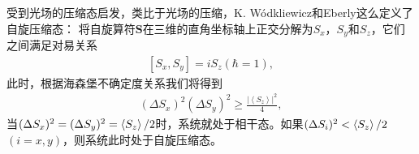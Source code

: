 受到光场的压缩态启发，类比于光场的压缩，K. W\'odkliewicz和Eberly\cite{wodkiewicz1987k}这么定义了自旋压缩态：
将自旋算符$\mathbf{S}$在三维的直角坐标轴上正交分解为$S_x$，$S_y$和$S_z$，它们之间满足对易关系
\begin{align}
	\left[ {{S_x},{S_y}} \right] = i{S_z}\left( {\hbar  = 1} \right),\label{eq338}
\end{align}
此时，根据海森堡不确定度关系我们将得到
\begin{align}
	{\left( {\Delta {S_x}} \right)^2}{\left( {\Delta {S_y}} \right)^2} \ge \frac{{{{\left| {\left\langle {{S_z}} \right\rangle } \right|}^2}}}{4},\label{eq339}
\end{align}
当$(\Delta S_x)^2=(\Delta S_y)^2=\braket{ S_z}/2$时，系统就处于相干态。如果$(\Delta S_i)^2<\braket{S_z}/2$$(i=x,y)$，则系统此时处于自旋压缩态。

